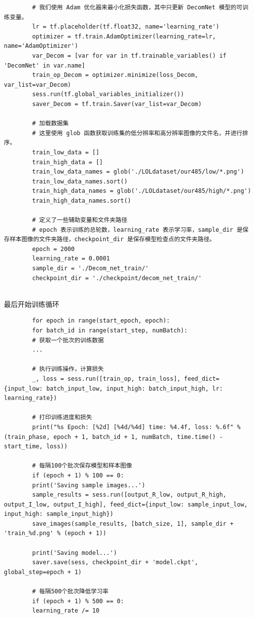 \documentclass[letterpaper,12pt]{article}
\begin{document}
	\lstset{language=python,breaklines=true}
	\begin{lstlisting}
		# 我们使用 Adam 优化器来最小化损失函数，其中只更新 DecomNet 模型的可训练变量。
		lr = tf.placeholder(tf.float32, name='learning_rate')
		optimizer = tf.train.AdamOptimizer(learning_rate=lr, name='AdamOptimizer')
		var_Decom = [var for var in tf.trainable_variables() if 'DecomNet' in var.name]
		train_op_Decom = optimizer.minimize(loss_Decom, var_list=var_Decom)
		sess.run(tf.global_variables_initializer())
		saver_Decom = tf.train.Saver(var_list=var_Decom)
		
		# 加载数据集
		# 这里使用 glob 函数获取训练集的低分辨率和高分辨率图像的文件名，并进行排序。
		train_low_data = []
		train_high_data = []
		train_low_data_names = glob('./LOLdataset/our485/low/*.png') 
		train_low_data_names.sort()
		train_high_data_names = glob('./LOLdataset/our485/high/*.png') 
		train_high_data_names.sort()
		
		# 定义了一些辅助变量和文件夹路径
		# epoch 表示训练的总轮数，learning_rate 表示学习率，sample_dir 是保存样本图像的文件夹路径，checkpoint_dir 是保存模型检查点的文件夹路径。
		epoch = 2000
		learning_rate = 0.0001
		sample_dir = './Decom_net_train/'
		checkpoint_dir = './checkpoint/decom_net_train/'
		
	\end{lstlisting}
	
	最后开始训练循环
	
	\lstset{language=python,breaklines=true}
	\begin{lstlisting}
		for epoch in range(start_epoch, epoch):
		for batch_id in range(start_step, numBatch):
		# 获取一个批次的训练数据
		...
		
		# 执行训练操作，计算损失
		_, loss = sess.run([train_op, train_loss], feed_dict={input_low: batch_input_low, input_high: batch_input_high, lr: learning_rate})
		
		# 打印训练进度和损失
		print("%s Epoch: [%2d] [%4d/%4d] time: %4.4f, loss: %.6f" % (train_phase, epoch + 1, batch_id + 1, numBatch, time.time() - start_time, loss))
		
		# 每隔100个批次保存模型和样本图像
		if (epoch + 1) % 100 == 0:
		print('Saving sample images...')
		sample_results = sess.run([output_R_low, output_R_high, output_I_low, output_I_high], feed_dict={input_low: sample_input_low, input_high: sample_input_high})
		save_images(sample_results, [batch_size, 1], sample_dir + 'train_%d.png' % (epoch + 1))
		
		print('Saving model...')
		saver.save(sess, checkpoint_dir + 'model.ckpt', global_step=epoch + 1)
		
		# 每隔500个批次降低学习率
		if (epoch + 1) % 500 == 0:
		learning_rate /= 10
	\end{lstlisting}
	
\end{document}
